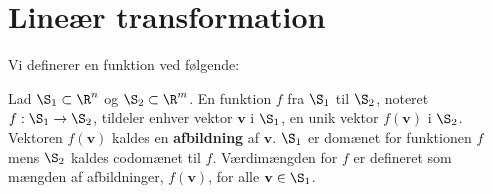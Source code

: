 \section{Lineær transformation}
%
Vi definerer en funktion ved følgende:
%
\begin{defn}{}{}
Lad $\S _1 \subset \R^n$ og $\S _2 \subset \R^m$.
En funktion $f$ fra $\S_1$ til $\S_2$, noteret $f:\S_1\rightarrow\S_2$, tildeler enhver vektor $\textbf{v}$ i $\S_1$, en unik vektor $f(\textbf{v})$ i $\S_2$.
Vektoren $f(\textbf{v})$ kaldes en \textbf{afbildning} af $\textbf{v}$.
$\S_1$ er domænet for funktionen $f$ mens $\S_2$ kaldes codomænet til $f$.
Værdimængden for $f$ er defineret som mængden af afbildninger, $f(\textbf{v})$, for alle $\textbf{v}\in \S_1$.
\end{defn}


